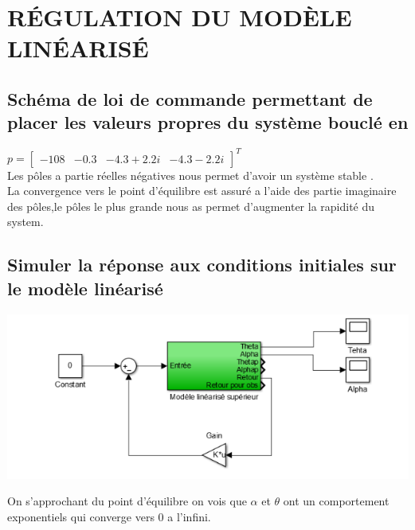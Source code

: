 \documentclass[12pt, a4paper, openany]{report}
\begin{document}
 
 
 
\chapter{RÉGULATION DU MODÈLE LINÉARISÉ}

     \section{Schéma de loi de commande permettant de placer les valeurs propres du système bouclé en}
  $p=
  \begin{bmatrix}
  -108&-0.3&-4.3+2.2i&-4.3-2.2i
  \end{bmatrix}^{T}$\\
  
  
   Les pôles a partie  réelles négatives nous permet d'avoir un système stable .\\

   La convergence vers le point d’équilibre est  assuré a l'aide des partie imaginaire des pôles,le pôles    le plus grande nous as permet d’augmenter la rapidité du system.\\ 
   
    \section{Simuler la réponse aux conditions initiales sur le modèle linéarisé}          
       
\begin{center}
\includegraphics[scale=0.6]{simdispol.png}
\label{simdispol}
\end{center}



     On s’approchant du point d’équilibre on vois que  $\alpha$ et $\theta$ ont un comportement exponentiels qui converge vers 0 a l'infini.\\ 
\end{document}
